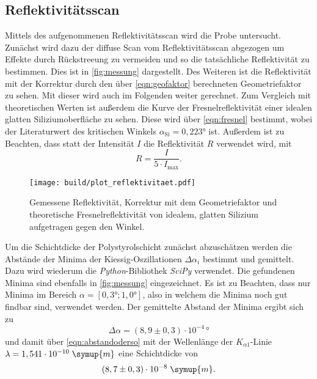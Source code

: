 \subsection{Reflektivitätsscan}
Mittels des aufgenommenen Reflektivitätsscan wird die Probe untersucht. Zunächst wird dazu der 
diffuse Scan vom Reflektivitätsscan abgezogen um Effekte durch Rückstreeung zu vermeiden und so 
die tatsächliche Reflektivität zu bestimmen. Dies ist in \autoref{fig:messung}
dargestellt. Des Weiteren ist die Reflektivität mit der Korrektur durch den über 
\autoref{eqn:geofaktor} berechneten Geometriefaktor zu sehen. Mit dieser wird auch im Folgenden 
weiter gerechnet. Zum Vergleich mit theoretischen Werten ist außerdem die Kurve der Fresnelreflektivität 
einer idealen glatten Siliziumoberfläche zu sehen. Diese wird über 
\autoref{eqn:fresnel} bestimmt, wobei der Literaturwert des kritischen Winkels $\alpha_{\text{Si}} = 0,223°$ \cite{tolan} ist.
Außerdem ist zu Beachten, dass statt der Intensität $I$ die Reflektivität $R$ verwendet wird,
mit
\begin{equation*}
    R = \frac{I}{5 \cdot I_{\text{max}}}.
\end{equation*}
\begin{figure}
    \centering
    \texttt{[image: build/plot\_reflektivitaet.pdf]}
    \caption{Gemessene Reflektivität, Korrektur mit dem Geometriefaktor und theoretische Fresnelreflektivität von idealem, glatten Silizium aufgetragen gegen den Winkel.}
    \label{fig:messung}
\end{figure}

Um die Schichtdicke der Polystyrolschicht zunächst abzuschätzen werden die Abstände der Minima der Kiessig-Oszillationen $\Delta \alpha_i$
bestimmt und gemittelt. Dazu wird wiederum die \textit{Python}-Bibliothek \textit{SciPy} \cite{scipy}
verwendet. Die gefundenen Minima sind ebenfalls in \autoref{fig:messung} eingezeichnet.
Es ist zu Beachten, dass nur Minima im Bereich $\alpha = [0,3°; 1,0°]$, also in welchem 
die Minima noch gut findbar sind, verwendet werden.
Der gemittelte Abstand der Minima ergibt sich zu 
\begin{equation*}
    \Delta \alpha = (8,9 \pm 0,3) \cdot 10^{-4}\,°
\end{equation*}
und damit über \autoref{eqn:abstandoderso} mit der Wellenlänge der $K_{\alpha 1}$-Linie 
$\lambda = 1,541 \cdot 10^{-10} \; \symup{m}$ eine Schichtdicke von
\begin{equation*}
    (8,7 \pm 0,3)\cdot 10^{-8} \; \symup{m}.
\end{equation*}

